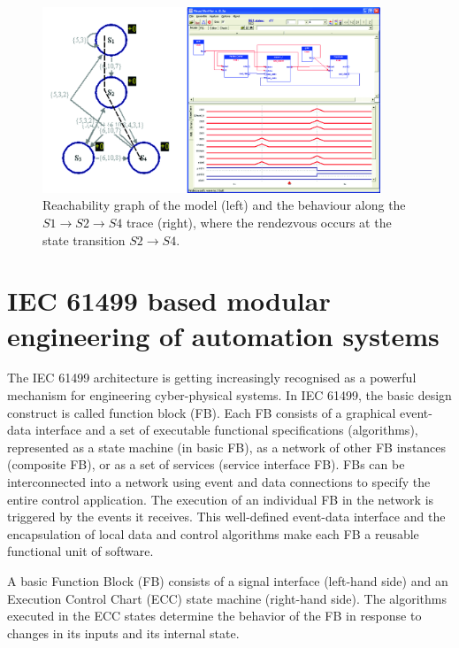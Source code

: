 \begin{bibunit}
\begin{figure}
    \centering
    \includegraphics[width=0.9\textwidth]{MX_Papers/Paper1/images/verification.jpg}
    \caption{Reachability graph of the model (left) and the behaviour along the $S1\rightarrow S2\rightarrow S4$ trace (right), where the rendezvous occurs at the state transition  $S2\rightarrow S4$.}
    \label{fig:verification}
\end{figure}

\section{IEC 61499 based modular engineering of automation systems}\label{sec:61499}

The {IEC 61499} architecture \cite{iec61499} is getting increasingly recognised as a powerful mechanism for engineering cyber-physical systems. 
In IEC 61499, the basic design construct is called function block (FB). Each FB consists of a graphical event-data interface and a set of executable functional specifications (algorithms), represented as a state machine (in basic FB), as a network of other FB instances (composite FB), or as a set of services (service interface FB). FBs can be interconnected into a network using event and data connections to specify the entire control application. The execution of an individual FB in the network is triggered by the events it receives. This well-defined event-data interface and the encapsulation of local data and control algorithms make each FB a reusable functional unit of software.

A basic Function Block (FB)  consists of a signal interface (left-hand side) and an Execution Control Chart (ECC) state machine (right-hand side). The algorithms executed in the ECC states determine the behavior of the FB in response to changes in its inputs and its internal state.


\end{bibunit}
